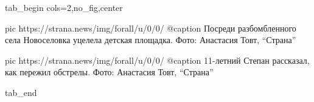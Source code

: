  
 
 
 
 

\ifcmt
  tab_begin cols=2,no_fig,center

     pic https://strana.news/img/forall/u/0/0/%
		 @caption Посреди разбомбленного села Новоселовка уцелела детская площадка. Фото: Анастасия Товт, \enquote{Страна}

		 pic https://strana.news/img/forall/u/0/0/%
		 @caption 11-летний Степан рассказал, как пережил обстрелы. Фото: Анастасия Товт, \enquote{Страна}

  tab_end
\fi
